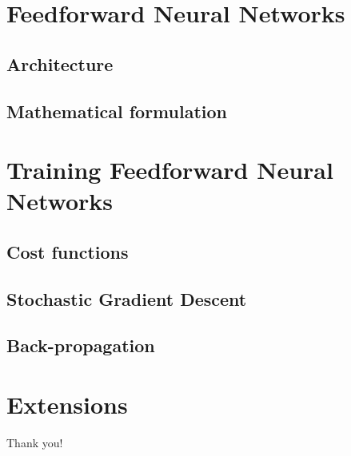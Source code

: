 \documentclass{beamer}
\begin{document}
	\section{Feedforward Neural Networks}
	\subsection{Architecture}
	\subsection{Mathematical formulation}
	\section{Training Feedforward Neural Networks}
	\subsection{Cost functions}
	\subsection{Stochastic Gradient Descent}
	\subsection{Back-propagation}
	\section{Extensions}
	
	\begin{frame}[standout]
	Thank you!
	\end{frame}
	
\end{document}
